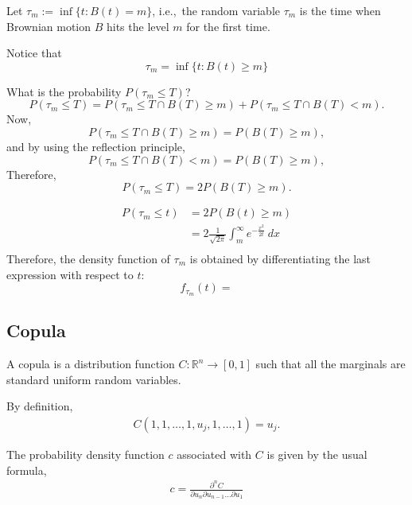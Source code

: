 \documentclass{amsart}
\theoremstyle{plain}
\numberwithin{equation}{section}
\begin{document}
Let $\tau_m := \inf \{ t: B(t) = m \}$, i.e.,\
the random variable $\tau_m$ is the time
when Brownian motion $B$ hits the 
level $m$ for the first time.

Notice that 
\begin{equation}
\tau_m = \inf \{t: B(t) \geq m\}
\end{equation}

What is the probability $P(\tau_m \leq T)$?
\begin{equation*}
P(\tau_m \leq T) = 
P(\tau_m \leq T \cap B(T) \geq m ) + 
P(\tau_m \leq T \cap B(T) < m ).
\end{equation*}
Now,
\begin{equation}
P(\tau_m \leq T \cap B(T) \geq m ) = P( B(T) \geq m ), 
\end{equation}
and by using the reflection principle,
\begin{equation}
P(\tau_m \leq T \cap B(T) < m ) = P( B(T) \geq m ), 
\end{equation}
Therefore,
\begin{equation}
P(\tau_m \leq T) = 2 P(B(T) \geq m ).
\end{equation}


\begin{align}
P(\tau_m \leq t) &= 2 P(B(t) \geq m )\\
                 &= 2 \frac{1}{\sqrt{2\pi}} \int_{m}^{\infty} e^{-\frac{x^2}{2t}} \: dx\\								
\end{align}
Therefore, the density function of
$\tau_m$ is obtained by differentiating the last expression 
with respect to $t$:
\begin{equation}
f_{\tau_m} (t) = 
\end{equation}
\subsection{Copula}
A copula is a distribution function $C: \mathbb{R}^n \to [0, 1]$ such that 
all the marginals are standard uniform random variables.

By definition,
\begin{align*}
C(1, 1, \ldots, 1, u_j, 1, \ldots, 1) = u_j.
\end{align*}

The probability density function $c$ associated with $C$ is given 
by the usual formula,
\begin{align*}
c = \frac{\partial^n C}{\partial u_n \partial u_{n-1} \ldots \partial u_1 }
\end{align*} 
\end{document}
